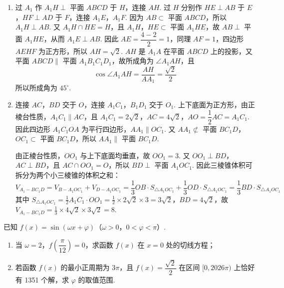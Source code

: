 \begin{solution}

\begin{enumerate}
\item 过 \(A_1\) 作 \(A_1H\perp\) 平面 \(ABCD\) 于 \(H\)，连接 \(AH\). 过 \(H\) 分别作 \(HE\perp AB\) 于 \(E\)，\(HF\perp AD\) 于 \(F\)，连接 \(A_1E\)，\(A_1F\). 因为 \(AB\subset\) 平面 \(ABCD\)，所以 \(A_1H\perp AB\). 又 \(A_1H\cap HE=H\)，且 \(A_1H\)，\(HE\subset\) 平面 \(A_1HE\)，故 \(AB\perp\) 平面 \(A_1HE\)，从而 \(A_1E\perp AB\). 因此 \(AE=\dfrac{4-2}{2}=1\)，同理 \(AF=1\)，四边形 \(AEHF\) 为正方形，所以 \(AH=\sqrt2\). \(AH\) 是 \(A_1A\) 在平面 \(ABCD\) 上的投影，又平面 \(ABCD\parallel\) 平面 \(A_1B_1C_1D_1\)，故所成角为 \(\angle A_1AH\)，且
\[
\cos\angle A_1AH=\frac{AH}{AA_1}=\frac{\sqrt2}{2}
\]
所以所成角为 \(45^\circ\).

\item 连接 \(AC\)，\(BD\) 交于 \(O\)，连接 \(A_1C_1\)，\(B_1D_1\) 交于 \(O_1\). 上下底面为正方形，由正棱台性质，\(A_1C_1\parallel AC\)，且 \(A_1C_1=2\sqrt2\)，\(AC=4\sqrt2\)，\(AO=\dfrac12AC=A_1C_1\). 因此四边形 \(A_1C_1OA\) 为平行四边形，\(AA_1\parallel OC_1\). 又 \(AA_1\not\subset\) 平面 \(BC_1D\)，\(OC_1\subset\) 平面 \(BC_1D\)，所以 \(AA_1\parallel\) 平面 \(BC_1D\).

由正棱台性质，\(OO_1\) 与上下底面均垂直，故 \(OO_1=3\). 又 \(OO_1\perp BD\)，\(AC\perp BD\)，且 \(AC\cap OO_1=O\)，所以 \(BD\perp\) 平面 \(A_1OC_1\). 因此三棱锥体积可拆分为两个小三棱锥的体积之和：
\[
V_{A_1-BC_1D}=V_{B-A_1OC_1}+V_{D-A_1OC_1}
=\frac13OB\cdot S_{\triangle A_1OC_1}+\frac13OD\cdot S_{\triangle A_1OC_1}
=\frac13BD\cdot S_{\triangle A_1OC_1}
\]
其中 \(S_{\triangle A_1OC_1}=\frac12A_1C_1\cdot OO_1=\frac12\times2\sqrt2\times3=3\sqrt2\)，\(BD=4\sqrt2\)，故 \(V_{A_1-BC_1D}=\frac13\times4\sqrt2\times3\sqrt2=8\).
\end{enumerate}

\end{solution}

\begin{problem}
已知 \(f(x)=\sin(\omega x+\varphi)\)（\(\omega>0\)，\(0<\varphi<\pi\)）.

\begin{enumerate}
\item 当 \(\omega=2\)，\(f\!\left(\dfrac{\pi}{12}\right)=0\)，求函数 \(f(x)\) 在 \(x=0\) 处的切线方程；
\item 若函数 \(f(x)\) 的最小正周期为 \(3\pi\)，且 \(f(x)=\dfrac{\sqrt2}{2}\) 在区间 \([0,2026\pi)\) 上恰好有 1351 个解，求 \(\varphi\) 的取值范围.
\end{enumerate}
\end{problem}

